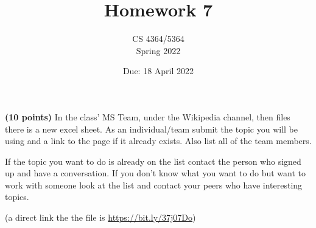 \documentclass[11pt, oneside]{article}   	%
\title{Homework 7}
\author{CS 4364/5364\\Spring 2022}
\date{Due: 18 April 2022}							%
\begin{document}
\maketitle

\textbf{(10 points)}
In the  class' MS Team, under the Wikipedia channel, then files there is a new excel sheet. 
As an individual/team submit the topic you will be using and a link to the page if it already exists. 
Also list all of the team members. 

If the topic you want to do is already on the list contact the person who signed up and have a conversation. 
If you don't know what you want to do but want to work with someone look at the list and contact your peers who have interesting topics. 

(a direct link the the file is \url{https://bit.ly/37j07Do})
\end{document}
